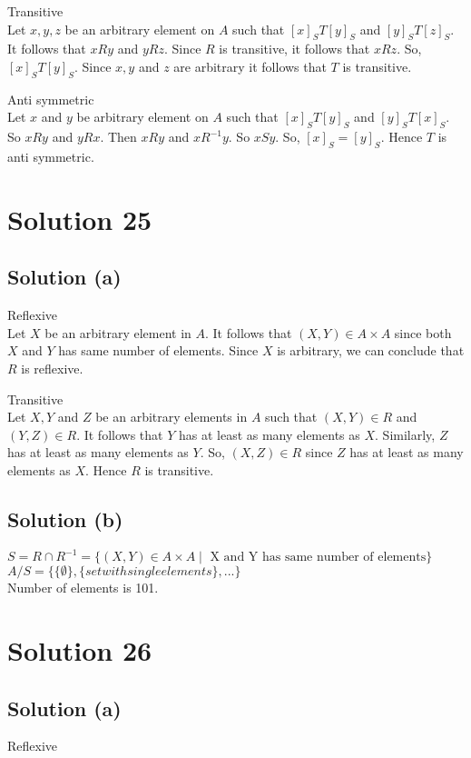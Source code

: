 \documentclass{article}
\begin{document}
Transitive \\
Let $x,y,z$ be an arbitrary element on $A$ such that $[x]_ST[y]_S$ and
$[y]_ST[z]_S$. It follows that $xRy$ and $yRz$. Since $R$ is
transitive, it follows that $xRz$. So, $[x]_ST[y]_S$. Since $x,y$ and
$z$ are arbitrary it follows that $T$ is transitive.

Anti symmetric \\
Let $x$ and $y$ be arbitrary element on $A$ such that $[x]_ST[y]_S$
and $[y]_ST[x]_S$. So $xRy$ and $yRx$. Then $xRy$ and $xR^{-1}y$. So
$xSy$. So, $[x]_S = [y]_S$. Hence $T$ is anti symmetric.

\section{Solution 25}
\subsection{Solution (a)}
Reflexive \\
Let $X$ be an arbitrary element in $A$. It follows that $(X,Y) \in A
\times A$ since both $X$ and $Y$ has same number of elements. Since
$X$ is arbitrary, we can conclude that $R$ is reflexive.

Transitive \\
Let $X,Y$ and $Z$ be an arbitrary elements in $A$ such that $(X,Y) \in
R$ and $(Y,Z) \in R$. It follows that $Y$ has at least as many
elements as $X$. Similarly, $Z$ has at least as many elements as $Y$.
So, $(X,Z) \in R$ since $Z$ has at least as many elements as $X$.
Hence $R$ is transitive.

\subsection{Solution (b)}
$S = R \cap R^{-1} = \{(X,Y) \in A \times A \mid \text{ X and Y has same
  number of elements}\}$ \\
$A/S = \{\{\emptyset\}, \{set with single elements\}, ... \}$ \\
Number of elements is 101.

\section{Solution 26}
\subsection{Solution (a)}
Reflexive \\
\end{document}
